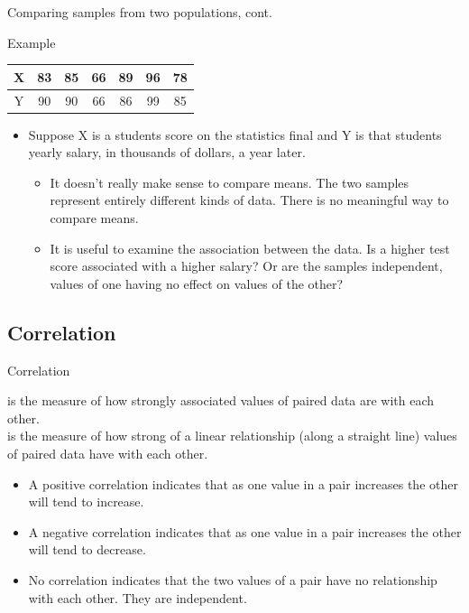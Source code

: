 \documentclass[xcolor=table, handout]{beamer}
\begin{document}
\begin{frame}{Comparing samples from two populations, cont.}
\begin{exampleblock}{Example}
\large
\smallskip
{\centering
\begin{tabular}{c | c c c c c c}
X & 83 & 85 & 66 & 89 & 96 & 78\\
\hline
Y & 90 & 90 & 66 & 86 & 99 & 85
\end{tabular}
\par}
\medskip
\begin{itemize}
\item Suppose X is a students score on the statistics final and Y is that students yearly salary, in thousands of dollars, a year later.
\begin{itemize}
\pause\item It doesn't really make sense to compare means. The two samples represent entirely different kinds of data. There is no meaningful way to compare means.
\pause\item It is useful to examine the association between the data. Is a higher test score associated with a higher salary? Or are the samples independent, values of one having no effect on values of the other?
\end{itemize}
\end{itemize}

\end{exampleblock}
\end{frame}

\subsection{Correlation}

\begin{frame}{Correlation}
\begin{block}{}
\large
{} is the measure of how strongly associated values of paired data are with each other.\\
\pause\medskip
{} is the measure of how strong of a linear relationship (along a straight line)  values of paired data have with each other. 
\begin{itemize}
\pause\item A positive correlation indicates that as one value in a pair increases the other will tend to increase.
\pause\item A negative correlation indicates that as one value in a pair increases the other will tend to decrease.
\pause\item No correlation indicates that the two values of a pair have no relationship with each other. They are independent.
\end{itemize}
\end{block}
\end{frame}
\end{document}
